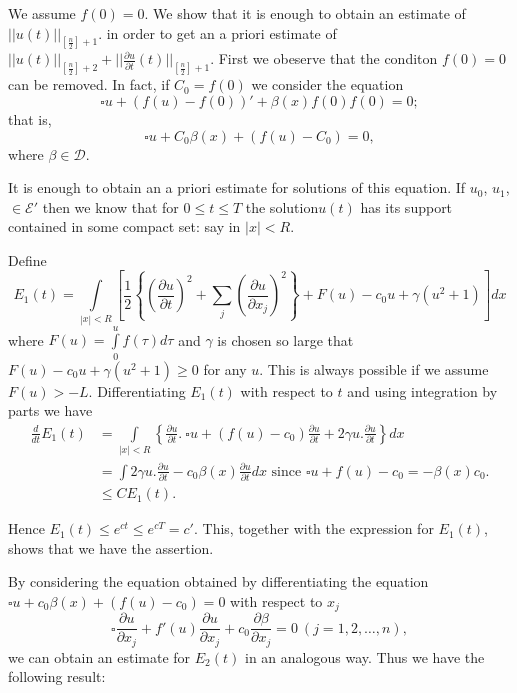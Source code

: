 We assume $f(0) = 0$. We show that it is enough to obtain an estimate
of $|| u (t)||_{[\frac{n}{2}] + 1}$. in order to get an a priori
estimate of $||u(t)||_{\left[\frac{n}{2}\right]+2}+||\frac{\partial
  u}{\partial t}(t)||_{\left[\frac{n}{2}\right]+1}$. First we obeserve that the
conditon $f(0) = 0$ can be removed. In fact, if $C_0 = f (0)$ we
consider the equation  
$$
\square u + ( f(u) - f(0))'+ \beta (x) f (0) f (0)= 0; 
$$
that is, 
$$
\square u + C_0 \beta (x) + (f(u) - C_0 ) = 0, 
$$
where $\beta \in \mathscr{D}$.  

It is enough to obtain an a priori estimate for solutions of this
equation. If $u_0$, $u_1$, $\in \mathscr{E}'$ then we know
that for $0 \leq t \leq T$ the solution\pageoriginale $u(t)$ has its
support contained in some compact set: say in $|x | < R$.  

Define
$$
E_1 (t) = \int\limits_{|x|<R} \left[ \frac{1}{2}\left\{ \left(\frac{\partial
    u}{\partial t}\right)^2 + \sum_j \left(\frac{\partial u}{\partial
    x_j}\right)^2 \right\} + F(u) - c_0 u + \gamma (u^2 + 1) \right] dx 
$$ 
where $F(u) = \int\limits_0^u f(\tau) d \tau$ and $\gamma$ is chosen so
large that $F(u) - c_0 u + \gamma (u^2 + 1) \geq 0$ for any $u$. This
is always possible if we assume $F(u) > - L$. Differentiating $E_1(t)$
with respect to $t$ and using integration by parts we have  
\begin{align*}
\frac{d}{dt} E_1 (t)  &= \int\limits_{|x| < R} \left\{ \frac{\partial
  u}{\partial t}. ~ \square  u + (f (u) - c_0 ) \frac{\partial
  u}{\partial t}  + 2 \gamma u. \frac{\partial u }{\partial t}
\right\} dx\\ 
&= \int 2\gamma u. \frac{\partial u}{\partial t} - c_0 \beta (x)
\frac{\partial u}{\partial t} dx \text{ since } \square u + f (u) -
c_0 = -\beta (x) c_0.\\ 
& \leq C E_1 (t). 
\end{align*}

Hence $E_1 (t) \leq e^{ct}\leq e^{cT} = c'$. This, together with the
expression for $E_1 (t)$, shows that we have the assertion. 

By considering the equation obtained by differentiating the equation
$\square u + c_0 \beta (x) + (f (u) - c_0) = 0$ with respect to $x_j$ 
$$
\square \frac{\partial u}{\partial x_j} + f' (u) \frac{\partial
  u}{\partial x_j} + c_0 \frac{\partial \beta}{\partial x_j} = 0\ (j =
1, 2, \ldots, n), 
$$
we can obtain an estimate for $E_2 (t)$ in an analogous way. Thus we
have the following result: 

